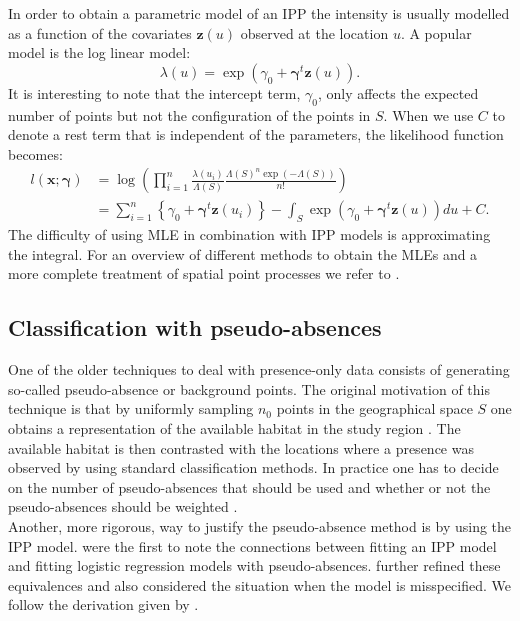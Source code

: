 In order to obtain a parametric model of an IPP the intensity is usually modelled as a function of the covariates $\bm{z}(u)$ observed at the location $u$. A popular model is the log linear model: 
\begin{equation*}
\label{eq:Intensity}
 \lambda(u) = \exp (\gamma_0  + \bm{\gamma}^t\bm{z}(u) ). 
\end{equation*}
It is interesting to note that the intercept term, $\gamma_0$, only affects the expected number of points but not the configuration of the points in $S$. When we use $C$ to denote a rest term that is independent of the parameters, the likelihood function becomes:
\begin{equation*}
\label{eq:IPPlikelihood}
\begin{aligned}
l(\bm{x};\bm{\gamma}) &= \log \left( \prod_{i=1}^n \frac{\lambda(u_i)}{\Lambda(S)} \frac{ \Lambda(S)^n \exp (-\Lambda(S))}{n!}\right)  \\ 
&= \sum_{i=1}^n \left\lbrace \gamma_0 + \bm{\gamma}^t\bm{z}(u_i) \right\rbrace - \int_S \exp (\gamma_0  + \bm{\gamma}^t\bm{z}(u)) du  + C.
\end{aligned}
\end{equation*}
The difficulty of using MLE in combination with IPP models is approximating the integral. For an overview of different methods to obtain the MLEs and a more complete treatment of spatial point processes we refer to \cite{moller_modern_2007}.

\subsection{Classification with pseudo-absences}
\label{sec:ClassificationWithPseudoAbsences}
One of the older techniques to deal with presence-only data consists of generating so-called pseudo-absence or background points. The original motivation of this technique is that by uniformly sampling $n_0$ points in the geographical space $S$ one obtains a representation of the available habitat in the study region \parencite{pearce_modelling_2006}. The available habitat is then contrasted with the locations where a presence was observed by using standard classification methods. In practice one has to decide on the number of pseudo-absences that should be used and whether or not the pseudo-absences should be weighted \parencite{barbet-massin_selecting_2012}.\\

Another, more rigorous, way to justify the pseudo-absence method is by using the IPP model. \cite{warton_poisson_2010} were the first to note the connections between fitting an IPP model and fitting logistic regression models with pseudo-absences. \cite{fithian_finite-sample_2013} further refined these equivalences and also considered the situation when the model is misspecified. We follow the derivation given by \cite{fithian_finite-sample_2013}.\\

